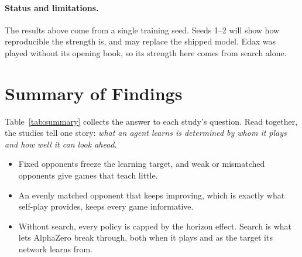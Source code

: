 \documentclass[11pt]{article}
\begin{document}
\paragraph{Status and limitations.} The results above come from a single
training seed. Seeds 1--2 will show how reproducible the strength is, and may
replace the shipped model. Edax was played without its opening book, so its
strength here comes from search alone.

\section{Summary of Findings}
\label{sec:summary}

Table~\ref{tab:summary} collects the answer to each study's question. Read
together, the studies tell one story: \emph{what an agent learns is determined
by whom it plays and how well it can look ahead}.
\begin{itemize}[leftmargin=*]
  \item Fixed opponents freeze the learning target, and weak or mismatched
        opponents give games that teach little.
  \item An evenly matched opponent that keeps improving, which is exactly what
        self-play provides, keeps every game informative.
  \item Without search, every policy is capped by the horizon effect. Search is
        what lets AlphaZero break through, both when it plays and as the target
        its network learns from.
\end{itemize}
\end{document}
